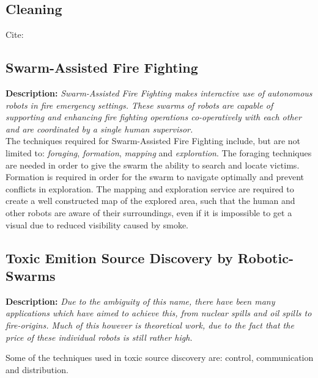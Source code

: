   \subsection{Cleaning}
    Cite: \cite{Wagner2008} \cite{Altshuler2005}
  
  \subsection{Swarm-Assisted Fire Fighting}
  \textbf{Description: }\emph{Swarm-Assisted Fire Fighting makes interactive use of autonomous robots in fire emergency settings. These swarms of robots are capable of supporting and enhancing fire fighting operations co-operatively with each other and are coordinated by a single human supervisor.}\cite{Naghsh2008,Penders2011}\\

  The techniques required for Swarm-Assisted Fire Fighting include, but are not limited to: \emph{foraging}, \emph{formation}, \emph{mapping} and \emph{exploration}.\cite{Naghsh2008,Penders2011} The foraging techniques are needed in order to give the swarm the ability to search and locate victims. Formation is required in order for the swarm to navigate optimally and prevent conflicts in exploration. The mapping and exploration service are required to create a well constructed map of the explored area, such that the human and other robots are aware of their surroundings, even if it is impossible to get a visual due to reduced visibility caused by smoke.

  \subsection{Toxic Emition Source Discovery by Robotic-Swarms}
  \textbf{Description: }\emph{Due to the ambiguity of this name, there have been many applications which have aimed to achieve this, from nuclear spills and oil spills to fire-origins. Much of this however is theoretical work, due to the fact that the price of these individual robots is still rather high.}

  Some of the techniques used in toxic source discovery are: control, communication and distribution.\cite{Li2012}
  
